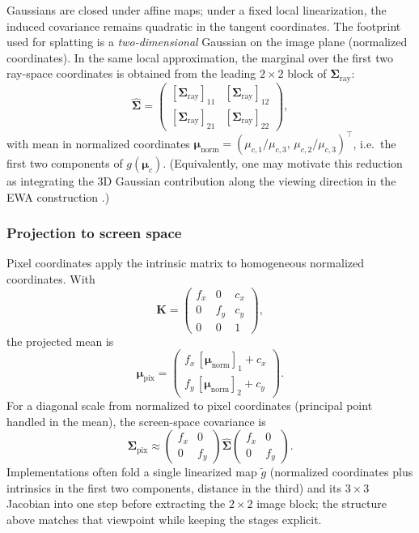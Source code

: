 \documentclass{report}
\begin{document}
Gaussians are closed under affine maps; under a fixed local linearization, the induced covariance remains quadratic in the tangent coordinates. The footprint used for splatting is a \emph{two-dimensional} Gaussian on the image plane (normalized coordinates). In the same local approximation, the marginal over the first two ray-space coordinates is obtained from the leading $2\times 2$ block of $\boldsymbol{\Sigma}_{\mathrm{ray}}$:
\[
\hat{\boldsymbol{\Sigma}} =
\begin{pmatrix}
[\boldsymbol{\Sigma}_{\mathrm{ray}}]_{11} & [\boldsymbol{\Sigma}_{\mathrm{ray}}]_{12} \\
[\boldsymbol{\Sigma}_{\mathrm{ray}}]_{21} & [\boldsymbol{\Sigma}_{\mathrm{ray}}]_{22}
\end{pmatrix},
\]
with mean in normalized coordinates $\boldsymbol{\mu}_{\mathrm{norm}}=(\mu_{c,1}/\mu_{c,3},\,\mu_{c,2}/\mu_{c,3})^\top$, i.e.\ the first two components of $g(\boldsymbol{\mu}_c)$. (Equivalently, one may motivate this reduction as integrating the 3D Gaussian contribution along the viewing direction in the EWA construction \cite{zwicker2002ewa}.)

\subsubsection{Projection to screen space}

Pixel coordinates apply the intrinsic matrix to homogeneous normalized coordinates. With
\[
\mathbf{K}=
\begin{pmatrix}
f_x & 0 & c_x \\
0 & f_y & c_y \\
0 & 0 & 1
\end{pmatrix},
\]
the projected mean is
\[
\boldsymbol{\mu}_{\mathrm{pix}}=
\begin{pmatrix}
f_x\,[\boldsymbol{\mu}_{\mathrm{norm}}]_1 + c_x \\
f_y\,[\boldsymbol{\mu}_{\mathrm{norm}}]_2 + c_y
\end{pmatrix}.
\]
For a diagonal scale from normalized to pixel coordinates (principal point handled in the mean), the screen-space covariance is
\[
\boldsymbol{\Sigma}_{\mathrm{pix}} \approx
\begin{pmatrix}
f_x & 0 \\
0 & f_y
\end{pmatrix}
\hat{\boldsymbol{\Sigma}}
\begin{pmatrix}
f_x & 0 \\
0 & f_y
\end{pmatrix}.
\]
Implementations often fold a single linearized map $\tilde{g}$ (normalized coordinates plus intrinsics in the first two components, distance in the third) and its $3\times 3$ Jacobian into one step before extracting the $2\times 2$ image block; the structure above matches that viewpoint while keeping the stages explicit.
\end{document}

